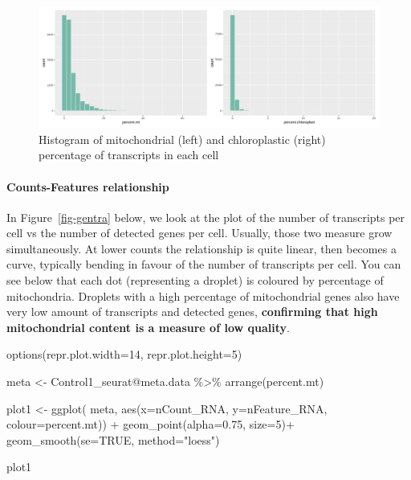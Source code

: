 \documentclass[
  letterpaper,
  DIV=11,
  numbers=noendperiod]{scrartcl}
\let\oldparagraph\paragraph
\renewcommand{\paragraph}[1]{\oldparagraph{#1}\mbox{}}
\newenvironment{Shaded}{\begin{snugshade}}{\end{snugshade}}
\newcommand{\AttributeTok}[1]{\textcolor[rgb]{0.49,0.56,0.16}{#1}}
\newcommand{\ConstantTok}[1]{\textcolor[rgb]{0.53,0.00,0.00}{#1}}
\newcommand{\DecValTok}[1]{\textcolor[rgb]{0.25,0.63,0.44}{#1}}
\newcommand{\FloatTok}[1]{\textcolor[rgb]{0.25,0.63,0.44}{#1}}
\newcommand{\FunctionTok}[1]{\textcolor[rgb]{0.02,0.16,0.49}{#1}}
\newcommand{\NormalTok}[1]{\textcolor[rgb]{0.00,0.44,0.13}{#1}}
\newcommand{\OtherTok}[1]{\textcolor[rgb]{0.00,0.44,0.13}{#1}}
\newcommand{\SpecialCharTok}[1]{\textcolor[rgb]{0.25,0.44,0.63}{#1}}
\newcommand{\StringTok}[1]{\textcolor[rgb]{0.25,0.44,0.63}{#1}}
\begin{document}
\begin{figure}[H]

{\centering \includegraphics{notebook_files/figure-pdf/fig-mt-output-2.png}

}

\caption{\label{fig-mt}Histogram of mitochondrial (left) and
chloroplastic (right) percentage of transcripts in each cell}

\end{figure}

\hypertarget{counts-features-relationship}{%
\paragraph{Counts-Features
relationship}\label{counts-features-relationship}}

In Figure~\ref{fig-gentra} below, we look at the plot of the number of
transcripts per cell vs the number of detected genes per cell. Usually,
those two measure grow simultaneously. At lower counts the relationship
is quite linear, then becomes a curve, typically bending in favour of
the number of transcripts per cell. You can see below that each dot
(representing a droplet) is coloured by percentage of mitochondria.
Droplets with a high percentage of mitochondrial genes also have very
low amount of transcripts and detected genes, \textbf{confirming that
high mitochondrial content is a measure of low quality}.

\begin{Shaded}
\begin{Highlighting}[]
\FunctionTok{options}\NormalTok{(}\AttributeTok{repr.plot.width=}\DecValTok{14}\NormalTok{, }\AttributeTok{repr.plot.height=}\DecValTok{5}\NormalTok{)}

\NormalTok{meta }\OtherTok{\textless{}{-}}\NormalTok{ Control1\_seurat}\SpecialCharTok{@}\NormalTok{meta.data }\SpecialCharTok{\%\textgreater{}\%} \FunctionTok{arrange}\NormalTok{(percent.mt)}

\NormalTok{plot1 }\OtherTok{\textless{}{-}} \FunctionTok{ggplot}\NormalTok{( meta, }\FunctionTok{aes}\NormalTok{(}\AttributeTok{x=}\NormalTok{nCount\_RNA, }\AttributeTok{y=}\NormalTok{nFeature\_RNA, }\AttributeTok{colour=}\NormalTok{percent.mt)) }\SpecialCharTok{+} 
         \FunctionTok{geom\_point}\NormalTok{(}\AttributeTok{alpha=}\FloatTok{0.75}\NormalTok{, }\AttributeTok{size=}\DecValTok{5}\NormalTok{)}\SpecialCharTok{+}
         \FunctionTok{geom\_smooth}\NormalTok{(}\AttributeTok{se=}\ConstantTok{TRUE}\NormalTok{, }\AttributeTok{method=}\StringTok{"loess"}\NormalTok{)}

\NormalTok{plot1}
\end{Highlighting}
\end{Shaded}
\end{document}
